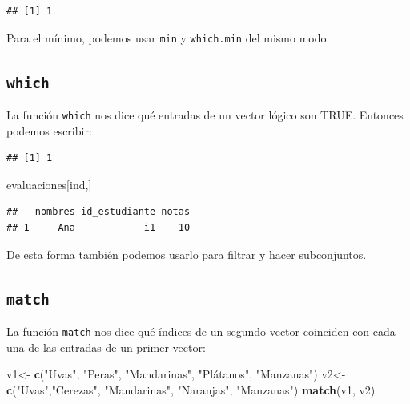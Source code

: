 \documentclass[
]{book}
\newenvironment{Shaded}{\begin{snugshade}}{\end{snugshade}}
\newcommand{\FunctionTok}[1]{\textcolor[rgb]{0.13,0.29,0.53}{\textbf{#1}}}
\newcommand{\NormalTok}[1]{#1}
\newcommand{\OtherTok}[1]{\textcolor[rgb]{0.56,0.35,0.01}{#1}}
\newcommand{\SpecialCharTok}[1]{\textcolor[rgb]{0.81,0.36,0.00}{\textbf{#1}}}
\newcommand{\StringTok}[1]{\textcolor[rgb]{0.31,0.60,0.02}{#1}}
\begin{document}
\begin{verbatim}
## [1] 1
\end{verbatim}

Para el mínimo, podemos usar \texttt{min} y \texttt{which.min} del mismo modo.

\subsection{\texorpdfstring{\texttt{which}}{which}}\label{which}

La función \texttt{which} nos dice qué entradas de un vector lógico son TRUE.
Entonces podemos escribir:

\begin{Shaded}
\end{Shaded}

\begin{verbatim}
## [1] 1
\end{verbatim}

\begin{Shaded}
\begin{Highlighting}[]
\NormalTok{evaluaciones[ind,]}
\end{Highlighting}
\end{Shaded}

\begin{verbatim}
##   nombres id_estudiante notas
## 1     Ana            i1    10
\end{verbatim}

De esta forma también podemos usarlo para filtrar y hacer subconjuntos.

\subsection{\texorpdfstring{\texttt{match}}{match}}\label{match}

La función \texttt{match} nos dice qué índices de un segundo vector coinciden con cada una de las entradas de un primer vector:

\begin{Shaded}
\begin{Highlighting}[]
\NormalTok{v1}\OtherTok{\textless{}{-}} \FunctionTok{c}\NormalTok{(}\StringTok{"Uvas"}\NormalTok{, }\StringTok{"Peras"}\NormalTok{, }\StringTok{"Mandarinas"}\NormalTok{, }\StringTok{"Plátanos"}\NormalTok{, }\StringTok{"Manzanas"}\NormalTok{)}
\NormalTok{v2}\OtherTok{\textless{}{-}} \FunctionTok{c}\NormalTok{(}\StringTok{"Uvas"}\NormalTok{,}\StringTok{"Cerezas"}\NormalTok{, }\StringTok{"Mandarinas"}\NormalTok{, }\StringTok{"Naranjas"}\NormalTok{, }\StringTok{"Manzanas"}\NormalTok{) }
\FunctionTok{match}\NormalTok{(v1, v2)}
\end{Highlighting}
\end{Shaded}
\end{document}
